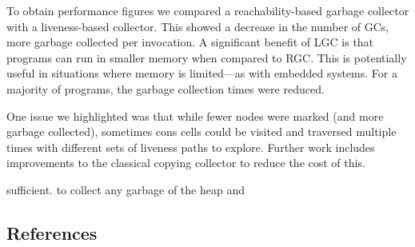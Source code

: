 \documentclass[9pt]{sigplanconf}
\begin{document}
To obtain performance figures we compared a reachability-based garbage
collector with a liveness-based  collector.  This showed a decrease in
the  number  of  GCs,   more  garbage  collected  per  invocation.   A
significant benefit of LGC is  that programs can run in smaller memory
when compared to  RGC. This is potentially useful  in situations where
memory  is  limited---as with  embedded  systems.  For  a majority  of
programs, the garbage collection times were reduced.

One issue we  highlighted was that while fewer  nodes were marked (and
more garbage collected), sometimes  cons cells could be visited and
traversed  multiple times  with different  sets of  liveness  paths to
explore.  Further work includes  improvements to the classical copying
collector to reduce the cost of this.



sufficient.
to collect any garbage
of the heap and

\subsection{References}
{}












\end{document}

